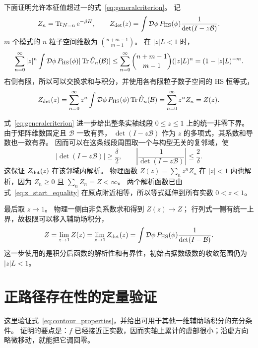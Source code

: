 \documentclass[UTF8,11pt,a4paper,fontset=fandol]{ctexart}
\newcommand{\Tr}{\operatorname{Tr}}
\newcommand{\ee}{\mathrm e}
\numberwithin{equation}{section}
\begin{document}
下面证明允许本征值超过一的式~\eqref{eq:generalcriterion}。
记
\begin{equation}
 Z_n=\Tr_{N=n}\ee^{-\beta H},\qquad
 Z_{\rm det}(z)=\int\mathcal D\phi\,P_{\rm HS}(\phi)
               \frac1{\det(I-z\mathcal B)}.
\end{equation}
$m$ 个模式的 $n$ 粒子空间维数为 $\binom{n+m-1}{m-1}$。
在 $|z|L<1$ 时，
\begin{equation}
 \sum_{n=0}^{\infty}|z|^n
 \int\mathcal D\phi\,P_{\rm HS}(\phi)
       |\Tr\hat U_n(\mathcal B)|
 \le\sum_{n=0}^{\infty}
 \binom{n+m-1}{m-1}(|z|L)^n
 =(1-|z|L)^{-m}.
\end{equation}
右侧有限，所以可以交换求和与积分，并使用各有限粒子数子空间的 HS 恒等式，
\begin{equation}
 Z_{\rm det}(z)
 =\sum_{n=0}^{\infty}z^n
   \int\mathcal D\phi\,P_{\rm HS}(\phi)\Tr\hat U_n(\mathcal B)
 =\sum_{n=0}^{\infty}z^n Z_n
 =Z(z).
 \label{eq:z_start_equality}
\end{equation}

式~\eqref{eq:generalcriterion} 进一步给出整条实轴线段 $0\le z\le1$ 上的统一非零下界。
由于矩阵维数固定且 $\mathcal B$ 一致有界，
$\det(I-z\mathcal B)$ 作为 $z$ 的多项式，其系数和导数也一致有界。
因而可以在这条线段周围取一个与构型无关的复邻域，使
\begin{equation}
 |\det(I-z\mathcal B)|\ge\frac{\delta}{2},
 \qquad
 \left|\frac1{\det(I-z\mathcal B)}\right|\le\frac2\delta.
\end{equation}
这保证 $Z_{\rm det}(z)$ 在该邻域内解析。
物理函数 $Z(z)=\sum_n z^n Z_n$ 在 $|z|<1$ 内也解析，因为
$Z_n\ge0$ 且 $\sum_nZ_n=Z<\infty$。
两个解析函数已由式~\eqref{eq:z_start_equality} 在原点附近相等，所以等式延伸到所有实数 $0<z<1$。

最后取 $z\to1$。
物理一侧由非负系数求和得到 $Z(z)\to Z$；
行列式一侧有统一上界，故极限可以移入辅助场积分，
\begin{equation}
 Z=\lim_{z\to1}Z(z)
  =\lim_{z\to1}Z_{\rm det}(z)
  =\int\mathcal D\phi\,P_{\rm HS}(\phi)
       \frac1{\det(I-\mathcal B)}.
\end{equation}
这一步使用的是积分后函数的解析性和有界性，初始占据数级数的收敛范围仍为 $|z|L<1$。
\section{正路径存在性的定量验证}
\label{sec:contour_existence}

这里验证式~\eqref{eq:contour_properties}，并给出可用于其他一维辅助场积分的充分条件。
证明的要点是：$f$ 已经接近正实数，因而实轴上累计的虚部很小；沿虚方向略微移动，就能把它调回零。
\end{document}
